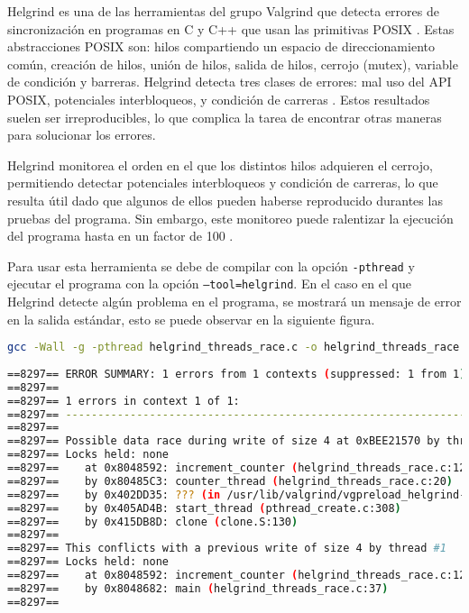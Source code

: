 Helgrind es una de las herramientas del grupo Valgrind que detecta errores de sincronización en programas en C y C++ que usan las primitivas POSIX \cite{POSIX}. Estas abstracciones POSIX son: \glspl{hilo} compartiendo un espacio de direccionamiento común, creación de \glspl{hilo}, unión de \glspl{hilo}, salida de \glspl{hilo}, \gls{cerrojo} (mutex), \gls{variable de condición} y \glspl{barrera}. Helgrind detecta tres clases de errores: mal uso del API POSIX, potenciales \glspl{interbloqueo}, y \glspl{condición de carrera} \cite{Helgrind}. 
Estos resultados suelen ser irreproducibles, lo que complica la tarea de encontrar otras maneras para solucionar los errores.

Helgrind monitorea el orden en el que los distintos \glspl{hilo} adquieren el \gls{cerrojo}, permitiendo detectar potenciales \glspl{interbloqueo} y \glspl{condición de carrera}, lo que resulta útil dado que algunos de ellos pueden haberse reproducido durantes las pruebas del programa. Sin embargo, este monitoreo puede ralentizar la ejecución del programa hasta en un factor de 100 \cite{Helgrind}.

Para usar esta herramienta se debe de compilar con la opción \texttt{-pthread} y ejecutar el programa con la opción \texttt{--tool=helgrind}. En el caso en el que Helgrind detecte algún problema en el programa, se mostrará un mensaje de error en la \gls{salida estándar}, esto se puede observar en la siguiente figura.

\begin{lstlisting}[language=bash, caption={Muestra de salida de Helgrind al detectar un error de condición de carrera \cite{HelgrindUc3m}}]
gcc -Wall -g -pthread helgrind_threads_race.c -o helgrind_threads_race valgrind -v  --tool=helgrind  ./helgrind_threads_race
    
==8297== ERROR SUMMARY: 1 errors from 1 contexts (suppressed: 1 from 1)
==8297== 
==8297== 1 errors in context 1 of 1:
==8297== ----------------------------------------------------------------
==8297== 
==8297== Possible data race during write of size 4 at 0xBEE21570 by thread #2
==8297== Locks held: none
==8297==    at 0x8048592: increment_counter (helgrind_threads_race.c:12)
==8297==    by 0x80485C3: counter_thread (helgrind_threads_race.c:20)
==8297==    by 0x402DD35: ??? (in /usr/lib/valgrind/vgpreload_helgrind-x86-linux.so)
==8297==    by 0x405AD4B: start_thread (pthread_create.c:308)
==8297==    by 0x415DB8D: clone (clone.S:130)
==8297== 
==8297== This conflicts with a previous write of size 4 by thread #1
==8297== Locks held: none
==8297==    at 0x8048592: increment_counter (helgrind_threads_race.c:12)
==8297==    by 0x8048682: main (helgrind_threads_race.c:37)
==8297== 
\end{lstlisting}
    
